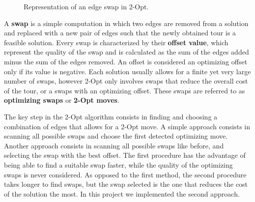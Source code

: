 \begin{figure}[htbp]
    \centering
    \caption{Representation of an edge swap in 2-Opt.}
    \label{fig:2optMoves}
\end{figure}

A \textbf{swap} is a simple computation in which two edges are removed from a solution and replaced with a new pair of edges such that the newly obtained tour is a feasible solution.
Every swap is characterized by their \textbf{offset value}, which represent the quality of the swap and is calculated as the sum of the edges added minus the sum of the edges removed.
An offset is considered an optimizing offset only if its value is negative.
Each solution usually allows for a finite yet very large number of swaps, however 2-Opt only involves swaps that reduce the overall cost of the tour, or a swaps with an optimizing offset.
These swaps are referred to as \textbf{optimizing swaps} or \textbf{2-Opt moves}.

The key step in the 2-Opt algorithm consists in finding and choosing a combination of edges that allows for a 2-Opt move.
A simple approach consists in scanning all possible swaps and choose the first detected optimizing move.
Another approach consists in scanning all possible swaps like before, and selecting the swap with the best offset.
The first procedure has the advantage of being able to find a suitable swap faster, while the quality of the optimizing swaps is never considered.
As opposed to the first method, the second procedure takes longer to find swaps, but the swap selected is the one that reduces the cost of the solution the most.
In this project we implemented the second approach.

